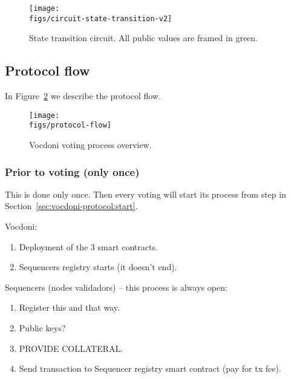 \begin{figure}[H]
	\centerline{\texttt{[image: \\figs/circuit-state-transition-v2]}}
	\caption{State transition circuit. All public values are framed in green.}
	\label{fig:circuit-state-transition-v2}
\end{figure}

\subsection{Protocol flow}
\label{sec:vocdoni-protocol:flow}

In Figure~\ref{fig:protocol-flow} we describe the protocol flow.


\begin{figure}[H]
	\centerline{\texttt{[image: \\figs/protocol-flow]}}
	\caption{Vocdoni voting process overview.}
	\label{fig:protocol-flow}
\end{figure}

\subsubsection{Prior to voting (only once)}
\label{sec:vocdoni-protocol:prior-steps}


This is done only once. Then every voting will start its process from step in Section~\ref{sec:vocdoni-protocol:start}.

Vocdoni:
\begin{enumerate}
	\item Deployment of the 3 smart contracts.
	\item Sequencers registry starts (it doesn't end).
\end{enumerate}

Sequencers (nodes validadors) -- this process is always open:
\begin{enumerate}
	\item Register this and that way.
	\item Public keys?
	\item PROVIDE COLLATERAL.
	\item Send transaction to Sequencer registry smart contract (pay for tx fee).
\end{enumerate}

